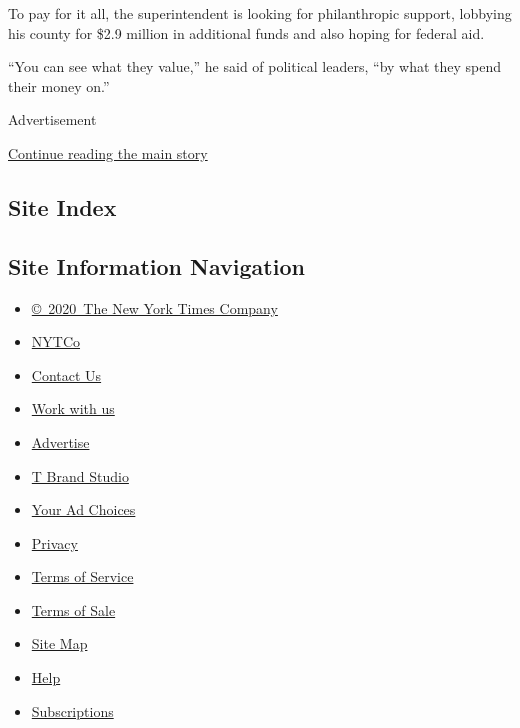 To pay for it all, the superintendent is looking for philanthropic
support, lobbying his county for \$2.9 million in additional funds and
also hoping for federal aid.

``You can see what they value,'' he said of political leaders, ``by what
they spend their money on.''

Advertisement

\protect\hyperlink{after-bottom}{Continue reading the main story}

\hypertarget{site-index}{%
\subsection{Site Index}\label{site-index}}

\hypertarget{site-information-navigation}{%
\subsection{Site Information
Navigation}\label{site-information-navigation}}

\begin{itemize}
\tightlist
\item
  \href{https://help.nytimes.com/hc/en-us/articles/115014792127-Copyright-notice}{©~2020~The
  New York Times Company}
\end{itemize}

\begin{itemize}
\tightlist
\item
  \href{https://www.nytco.com/}{NYTCo}
\item
  \href{https://help.nytimes.com/hc/en-us/articles/115015385887-Contact-Us}{Contact
  Us}
\item
  \href{https://www.nytco.com/careers/}{Work with us}
\item
  \href{https://nytmediakit.com/}{Advertise}
\item
  \href{http://www.tbrandstudio.com/}{T Brand Studio}
\item
  \href{https://www.nytimes.com/privacy/cookie-policy\#how-do-i-manage-trackers}{Your
  Ad Choices}
\item
  \href{https://www.nytimes.com/privacy}{Privacy}
\item
  \href{https://help.nytimes.com/hc/en-us/articles/115014893428-Terms-of-service}{Terms
  of Service}
\item
  \href{https://help.nytimes.com/hc/en-us/articles/115014893968-Terms-of-sale}{Terms
  of Sale}
\item
  \href{https://spiderbites.nytimes.com}{Site Map}
\item
  \href{https://help.nytimes.com/hc/en-us}{Help}
\item
  \href{https://www.nytimes.com/subscription?campaignId=37WXW}{Subscriptions}
\end{itemize}
